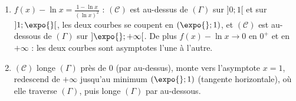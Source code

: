 \begin{corrige}
\begin{sol}
\begin{enumerate}
\begin{enumerate}
      \item $f(x) - \ln x = \frac{1 - \ln x}{(\ln x)^2}$ : $(\mathscr{C})$ est au-dessus de $(\Gamma)$ sur $]0;1[$ et sur $]1;\expo{}[$,
            les deux courbes se coupent en $(\expo{};1)$, et $(\mathscr{C})$ est au-dessous de $(\Gamma)$ sur $]\expo{};+\infty[$.
            De plus $f(x) - \ln x \to 0$ en $0^+$ et en $+\infty$ : les deux courbes sont asymptotes l'une \`a l'autre.
      \item $(\mathscr{C})$ longe $(\Gamma)$ pr\`es de $0$ (par au-dessus), monte vers l'asymptote $x = 1$, redescend de $+\infty$ jusqu'au minimum $(\expo{};1)$
            (tangente horizontale), o\`u elle traverse $(\Gamma)$, puis longe $(\Gamma)$ par au-dessous.
      \end{enumerate}
\end{enumerate}
\end{sol}


\end{corrige}
